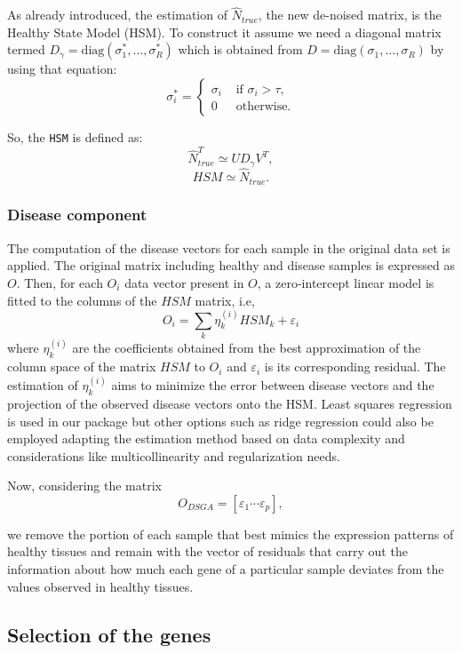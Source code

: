 As already introduced, the estimation of \(\hat{N}_{true}\), the new de-noised matrix, is the Healthy State Model (HSM). To construct it assume we need a diagonal matrix termed \(D_{\gamma} = \mathrm{diag}(\sigma_1^*,\ldots,\sigma_R^*)\) which is obtained from \(D = \mathrm{diag}(\sigma_1,\ldots,\sigma_R)\) by using that equation:
\[
  \sigma_i^* = \left\{
    \begin{array}{cc}
    \sigma_i & \text{ if } \sigma_i > \tau, \\ 
    0 & \text{ otherwise.}
    \end{array}
    \right.
\]

So, the \texttt{HSM} is defined as:
\[\hat{N}_{true}^T \simeq U D_{\gamma}V^T,\]
\[\textit{HSM} \simeq \hat{N}_{true}.\]

\hypertarget{section2.1.3}{%
\subsubsection{Disease component}\label{section2.1.3}}

The computation of the disease vectors for each sample in the original data set is applied. The original matrix including healthy and disease samples is expressed as \(O\). Then, for each \(O_{i}\) data vector present in \(O\), a zero-intercept linear model is fitted to the columns of the \(HSM\) matrix, i.e,
\[
O_i = \sum_k \eta_k^{(i)} HSM_k + \varepsilon_i
\]
where \(\eta_k^{(i)}\) are the coefficients obtained from the best approximation of the column space of the matrix \(HSM\) to \(O_i\) and \(\varepsilon_i\) is its corresponding residual. The estimation of \(\eta_k^{(i)}\) aims to minimize the error between disease vectors and the projection of the observed disease vectors onto the HSM. Least squares regression is used in our package but other options such as ridge regression could also be employed adapting the estimation method based on data complexity and considerations like multicollinearity and regularization needs.

Now, considering the matrix
\[
O_{DSGA} = [\varepsilon_1 \cdots \varepsilon_p],
\]

we remove the portion of each sample that best mimics the expression patterns of healthy tissues and remain with the vector of residuals that carry out the information about how much each gene of a particular sample deviates from the values observed in healthy tissues.

\hypertarget{section2.2}{%
\subsection{Selection of the genes}\label{section2.2}}

